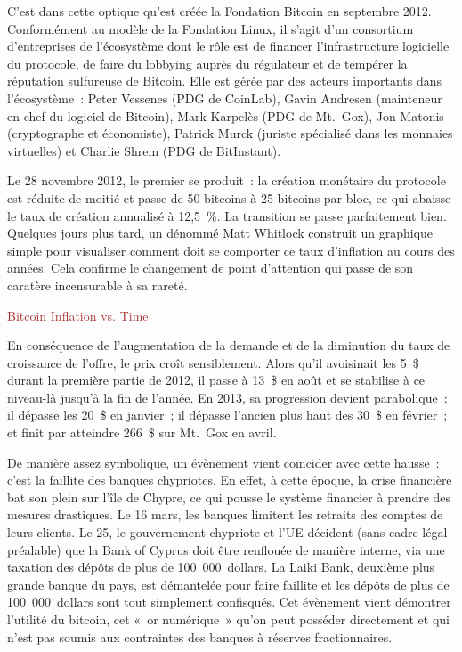 C'est dans cette optique qu'est créée la Fondation Bitcoin en septembre 2012. Conformément au modèle de la Fondation Linux, il s'agit d'un consortium d'entreprises de l'écosystème dont le rôle est de financer l'infrastructure logicielle du protocole, de faire du lobbying auprès du régulateur et de tempérer la réputation sulfureuse de Bitcoin. Elle est gérée par des acteurs importants dans l'écosystème~: Peter Vessenes (PDG de CoinLab), Gavin Andresen (mainteneur en chef du logiciel de Bitcoin), Mark Karpelès (PDG de Mt.~Gox), Jon Matonis (cryptographe et économiste), Patrick Murck (juriste spécialisé dans les monnaies virtuelles) et Charlie Shrem (PDG de BitInstant).

Le 28 novembre 2012, le premier  se produit~: la création monétaire du protocole est réduite de moitié et passe de 50 bitcoins à 25 bitcoins par bloc, ce qui abaisse le taux de création annualisé à 12,5~\%. La transition se passe parfaitement bien. Quelques jours plus tard, un dénommé Matt Whitlock construit un graphique simple pour visualiser comment doit se comporter ce taux d'inflation au cours des années. Cela confirme le changement de point d'attention qui passe de son caratère incensurable à sa rareté.

\textcolor{brown}{Bitcoin Inflation vs. Time}

En conséquence de l'augmentation de la demande et de la diminution du taux de croissance de l'offre, le prix croît sensiblement. Alors qu'il avoisinait les 5~\$ durant la première partie de 2012, il passe à 13~\$ en août et se stabilise à ce niveau-là jusqu'à la fin de l'année. En 2013, sa progression devient parabolique~: il dépasse les 20~\$ en janvier~; il dépasse l'ancien plus haut des 30~\$ en février~; et finit par atteindre 266~\$ sur Mt.~Gox en avril.

De manière assez symbolique, un évènement vient coïncider avec cette hausse~: c'est la faillite des banques chypriotes. En effet, à cette époque, la crise financière bat son plein sur l'île de Chypre, ce qui pousse le système financier à prendre des mesures drastiques. Le 16 mars, les banques limitent les retraits des comptes de leurs clients. Le 25, le gouvernement chypriote et l'UE décident (sans cadre légal préalable) que la Bank of Cyprus doit être renflouée de manière interne, via une taxation des dépôts de plus de 100~000~dollars. La Laiki Bank, deuxième plus grande banque du pays, est démantelée pour faire faillite et les dépôts de plus de 100~000~dollars sont tout simplement confisqués. Cet évènement vient démontrer l'utilité du bitcoin, cet «~or numérique~» qu'on peut posséder directement et qui n'est pas soumis aux contraintes des banques à réserves fractionnaires.

